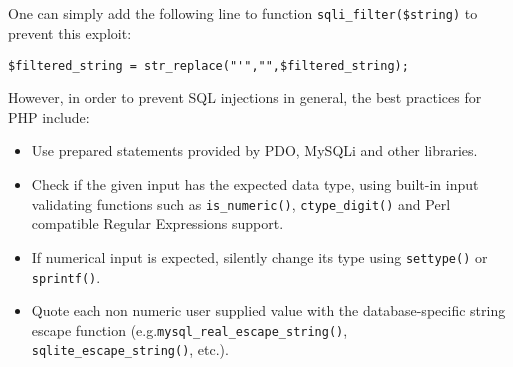 \documentclass[11pt]{article}
\begin{document}
\subsection{}
One can simply add the following line to function \verb|sqli_filter($string)| to prevent this exploit:
\begin{verbatim}
$filtered_string = str_replace("'","",$filtered_string);
\end{verbatim} 
However, in order to prevent SQL injections in general, the best practices for PHP include:
\begin{itemize}
\item Use prepared statements provided by PDO, MySQLi and other libraries.
\item Check if the given input has the expected data type, using built-in input validating functions such as \verb|is_numeric()|, \verb|ctype_digit()| and Perl compatible Regular Expressions support.
\item If numerical input is expected, silently change its type using \verb|settype()| or \verb|sprintf()|.
\item Quote each non numeric user supplied value with the database-specific string escape function (e.g.\verb|mysql_real_escape_string()|, \verb|sqlite_escape_string()|, etc.). 
\end{itemize}
\end{document}
